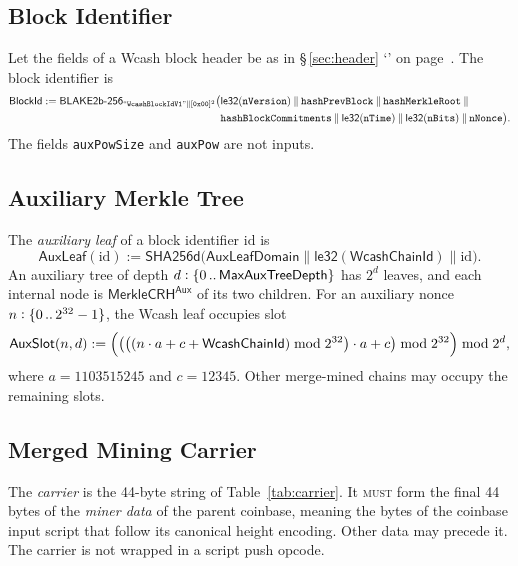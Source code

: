 \documentclass[10pt,letterpaper]{article}
\newcommand\term[1]{\textsl{#1}}
\newcommand\MUST{\textsc{must}}
\newcommand\typ{\mathrel{\vcentcolon}}
\newcommand\fn[1]{\mathsf{#1}}
\newcommand\cat{\mathbin{\|}}
\newcommand\ascii[1]{\text{\textquotedblleft\texttt{#1}\textquotedblright}}
\newcommand\secref[1]{\S\,\ref{#1} `\nameref{#1}' on page~\pageref{#1}}
\theoremstyle{plain}
\begin{document}
\subsection{Block Identifier}\label{sec:blockid}

Let the fields of a Wcash block header be as in \secref{sec:header}. The block identifier is
\[
\begin{aligned}
\fn{BlockId} := \fn{BLAKE2b\text{-}256}_{\ascii{WcashBlockIdV1} \cat [\mathtt{0x00}]^{2}}\bigl(&\fn{le32}(\mathtt{nVersion}) \cat \mathtt{hashPrevBlock} \cat \mathtt{hashMerkleRoot} \cat {}\\
&\mathtt{hashBlockCommitments} \cat \fn{le32}(\mathtt{nTime}) \cat \fn{le32}(\mathtt{nBits}) \cat \mathtt{nNonce}\bigr).
\end{aligned}
\]
The fields \texttt{auxPowSize} and \texttt{auxPow} are not inputs.

\subsection{Auxiliary Merkle Tree}\label{sec:auxtree}

The \term{auxiliary leaf} of a block identifier $\mathrm{id}$ is
\[
\fn{AuxLeaf}(\mathrm{id}) := \fn{SHA256d}\bigl(\fn{AuxLeafDomain} \cat \fn{le32}(\fn{WcashChainId}) \cat \mathrm{id}\bigr).
\]
An auxiliary tree of depth $d \typ \{0\,..\,\fn{MaxAuxTreeDepth}\}$ has $2^d$ leaves, and each internal node is $\fn{MerkleCRH^{Aux}}$ of its two children. For an auxiliary nonce $n \typ \{0\,..\,2^{32}-1\}$, the Wcash leaf occupies slot
\[
\fn{AuxSlot}(n, d) := \Bigl(\bigl(\bigl((n \cdot a + c + \fn{WcashChainId}) \bmod 2^{32}\bigr) \cdot a + c\bigr) \bmod 2^{32}\Bigr) \bmod 2^{d},
\]
where $a = 1103515245$ and $c = 12345$. Other merge-mined chains may occupy the remaining slots.

\subsection{Merged Mining Carrier}\label{sec:carrier}

The \term{carrier} is the 44-byte string of Table~\ref{tab:carrier}. It \MUST{} form the final 44 bytes of the \term{miner data} of the parent coinbase, meaning the bytes of the coinbase input script that follow its canonical height encoding. Other data may precede it. The carrier is not wrapped in a script push opcode.
\end{document}
